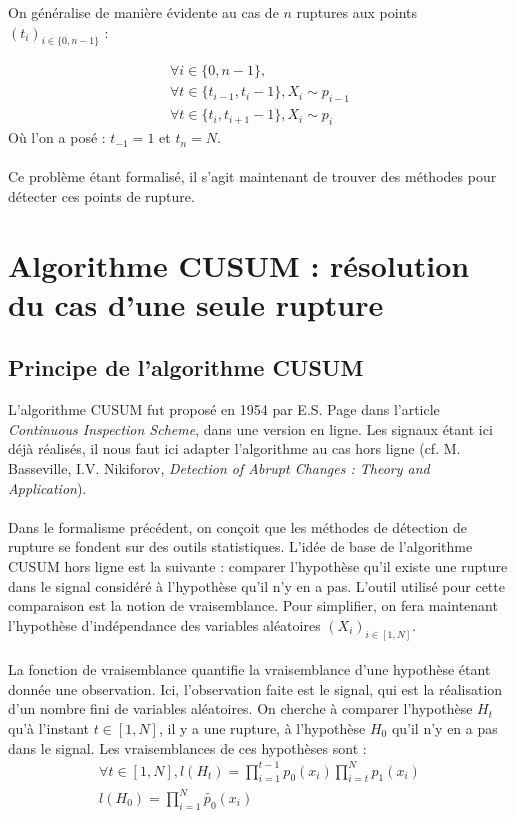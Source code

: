 \documentclass[french,12pt,notitlepage]{report}
\begin{document}
	On généralise de manière évidente au cas de $n$ ruptures aux points $(t_i)_{i \in \{0, n-1\}}$ :
	
	\begin{equation}
	\begin{array}{lll}
		\forall i \in \{0, n-1\}, \\
		\forall t \in \{t_{i-1}, t_i-1\}, X_i \sim p_{i-1} \\
		\forall t \in \{t_i, t_{i+1}-1\}, X_i \sim p_i
	\end{array}
	\end{equation}
	Où l'on a posé : $t_{-1} = 1$ et $t_n = N$.
	\\ \\
	Ce problème étant formalisé, il s'agit maintenant de trouver des méthodes pour détecter ces points de rupture.
	
	\chapter{Algorithme CUSUM : résolution du cas d'une seule rupture}
	
	
	\section{Principe de l'algorithme CUSUM}
	L'algorithme CUSUM fut proposé en 1954 par E.S. Page dans l'article \textit{Continuous Inspection Scheme}, dans une version en ligne. Les signaux étant ici déjà réalisés, il nous faut ici adapter l'algorithme au cas hors ligne (cf. M. Basseville, I.V. Nikiforov, \textit{Detection of Abrupt Changes : Theory and Application}).
	\\ \\
	Dans le formalisme précédent, on conçoit que les méthodes de détection de rupture se fondent sur des outils statistiques. L'idée de base de l'algorithme CUSUM hors ligne est la suivante : comparer l'hypothèse qu'il existe une rupture dans le signal considéré à l'hypothèse qu'il n'y en a pas. L'outil utilisé pour cette comparaison est la notion de vraisemblance. Pour simplifier, on fera maintenant l'hypothèse d'indépendance des variables aléatoires $(X_i)_{i \in [1,N]}$.
	\\ \\
	La fonction de vraisemblance quantifie la vraisemblance d'une hypothèse étant donnée une observation. Ici, l'observation faite est le signal, qui est la réalisation d'un nombre fini de variables aléatoires. On cherche à comparer l'hypothèse $H_t$ qu'à l'instant $t \in [1, N]$, il y a une rupture, à l'hypothèse $H_0$ qu'il n'y en a pas dans le signal. Les vraisemblances de ces hypothèses sont :
	\begin{equation}
	\begin{array}{ll}
		\forall t \in [1, N],l(H_t) = \prod_{i = 1}^{t-1} p_0(x_i) \prod_{i = t}^{N} p_1(x_i) \\
		l(H_0) = \prod_{i = 1}^N \tilde{p_0}(x_i) \\
	\end{array}	
	\end{equation}
	
\end{document}
